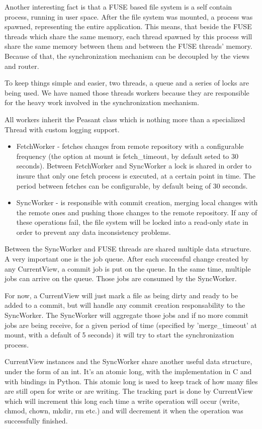 Another interesting fact is that a FUSE based file system is a self contain process, running in user space. After the file system was mounted, a process was spawned, representing the entire application. This means, that beside the FUSE threads which share the same memory, each thread spawned by this process will share the same memory between them and between the FUSE threads' memory. Because of that, the synchronization mechanism can be decoupled by the views and router.

To keep things simple and easier, two threads, a queue and a series of locks are being used. We have named those threads workers because they are responsible for the heavy work involved in the synchronization mechanism.

All workers inherit the Peasant class which is nothing more than a specialized Thread with custom logging support.
\begin{itemize}
    \item FetchWorker - fetches changes from remote repository with a configurable frequency (the option at mount is fetch\_timeout, by default seted to 30 seconds). Between FetchWorker and SyncWorker a lock is shared in order to insure that only one fetch process is executed, at a certain point in time. The period between fetches can be configurable, by default being of 30 seconds.
    \item SyncWorker - is responsible with commit creation, merging local changes with the remote ones and pushing those changes to the remote repository. If any of these operations fail, the file system will be locked into a read-only state in order to prevent any data inconsistency problems.
\end{itemize}

Between the SyncWorker and FUSE threads are shared multiple data structure. A very important one is the job queue. After each successful change created by any CurrentView, a commit job is put on the queue. In the same time, multiple jobs can arrive on the queue. Those jobs are consumed by the SyncWorker.

For now, a CurrentView will just mark a file as being dirty and ready to be added to a commit, but will handle any commit creation responsability to the SyncWorker. The SyncWorker will aggregate those jobs and if no more commit jobs are being receive, for a given period of time (specified by 'merge\_timeout' at mount, with a default of 5 seconds) it will try to start the synchronization process.

CurrentView instances and the SyncWorker share another useful data structure, under the form of an int. It's an atomic long, with the implementation in C and with bindings in Python. This atomic long is used to keep track of how many files are still open for write or are writing. The tracking part is done by CurrentView which will increment this long each time a write operation will occur (write, chmod, chown, mkdir, rm etc.) and will decrement it when the operation was successfully finished.

